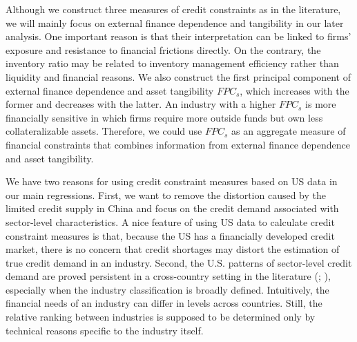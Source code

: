 Although we construct three measures of credit constraints as in the literature, we will mainly focus on external finance dependence and tangibility in our later analysis. One important reason is that their interpretation can be linked to firms' exposure and resistance to financial frictions directly. On the contrary, the inventory ratio may be related to inventory management efficiency rather than liquidity and financial reasons. We also construct the first principal component of external finance dependence and asset tangibility $FPC_{s}$, which increases with the former and decreases with the latter. An industry with a higher $FPC_{s}$ is more financially sensitive in which firms require more outside funds but own less collateralizable assets. Therefore, we could use $FPC_{s}$ as an aggregate measure of financial constraints that combines information from external finance dependence and asset tangibility.

We have two reasons for using credit constraint measures based on US data in our main regressions. First, we want to remove the distortion caused by the limited credit supply in China and focus on the credit demand associated with sector-level characteristics. A nice feature of using US data to calculate credit constraint measures is that, because the US has a financially developed credit market, there is no concern that credit shortages may distort the estimation of true credit demand in an industry. Second, the U.S. patterns of sector-level credit demand are proved persistent in a cross-country setting in the literature (\cite{manova-wei-zhang2015}; \cite{fan-lai-li2015}), especially when the industry classification is broadly defined. Intuitively, the financial needs of an industry can differ in levels across countries. Still, the relative ranking between industries is supposed to be determined only by technical reasons specific to the industry itself.

